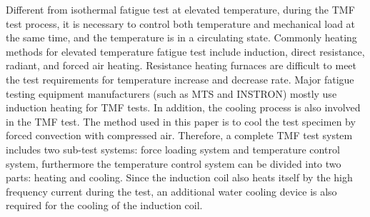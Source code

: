 Different from isothermal fatigue test at elevated temperature, during the TMF test process, it is necessary to control both temperature and mechanical load at the same time, and the temperature is in a circulating state.
Commonly heating methods for elevated temperature fatigue test include induction, direct resistance, radiant, and forced air heating.
Resistance heating furnaces are difficult to meet the test requirements for temperature increase and decrease rate. Major fatigue testing equipment manufacturers (such as MTS and INSTRON) mostly use induction heating for TMF tests.
In addition, the cooling process is also involved in the TMF test. The method used in this paper is to cool the test specimen by forced convection with compressed air.
Therefore, a complete TMF test system includes two sub-test systems: force loading system and temperature control system, furthermore the temperature control system can be divided into two parts: heating and cooling.
Since the induction coil also heats itself by the high frequency current during the test, an additional water cooling device is also required for the cooling of the induction coil.

